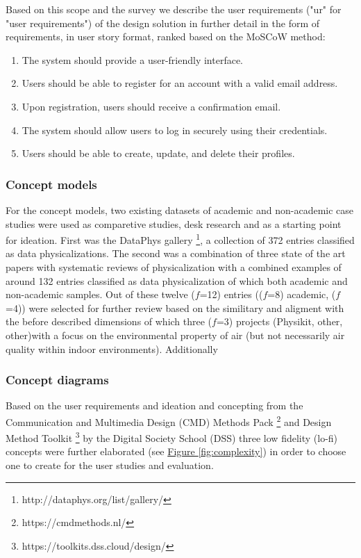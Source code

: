 Based on this scope and the survey we describe the user requirements ("ur" for "user requirements") of the design solution in further detail in the form of requirements, in user story format, ranked based on the MoSCoW method:

\begin{enumerate}
    \renewcommand{\labelenumi}{UR\arabic{enumi}:}
    \item The system should provide a user-friendly interface.
    \item Users should be able to register for an account with a valid email address.
    \item Upon registration, users should receive a confirmation email.
    \item The system should allow users to log in securely using their credentials.
    \item Users should be able to create, update, and delete their profiles.
\end{enumerate}

\subsubsection{Concept models}

For the concept models, two existing datasets of academic and non-academic case studies were used as comparetive studies, desk research and as a starting point for ideation. First was the DataPhys gallery \footnote{http://dataphys.org/list/gallery/}, a collection of 372 entries classified as data physicalizations. The second was a combination of three state of the art papers with systematic reviews of physicalization with a combined examples of around 132 entries classified as data physicalization of which both academic and non-academic samples. Out of these twelve ($f$=12) entries (($f$=8) academic, ($f$=4)) were selected for further review based on the similitary and aligment with the  before described dimensions of which three ($f$=3) projects (Physikit, other, other)with a focus on the environmental property of air (but not necessarily air quality within indoor environments). Additionally 

\subsubsection{Concept diagrams}

Based on the user requirements and ideation and concepting from the Communication and Multimedia Design (CMD) Methods Pack \footnote{https://cmdmethods.nl/} and Design Method Toolkit \footnote{https://toolkits.dss.cloud/design/} by the Digital Society School (DSS) three low fidelity (lo-fi) concepts were further elaborated (see \hyperref[fig:complexity]{Figure \ref*{fig:complexity}}) in order to choose one to create for the user studies and evaluation. 


